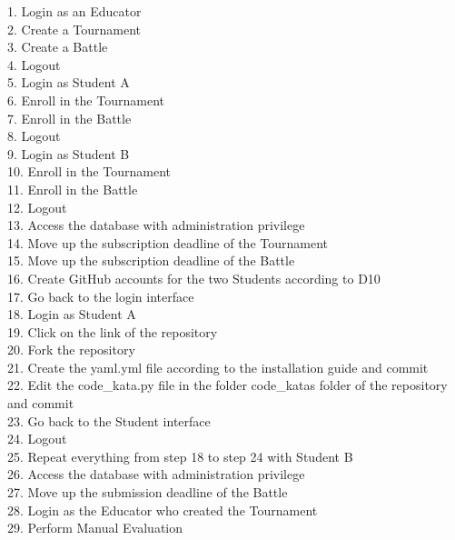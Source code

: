 \documentclass{Configuration_Files/Template}
\begin{document}
\begin{itemize}
\begin{enumerate}
            1. Login as an Educator\\
            2. Create a Tournament\\
            3. Create a Battle\\
            4. Logout\\
            5. Login as Student A\\
            6. Enroll in the Tournament\\
            7. Enroll in the Battle\\
            8. Logout\\
            9. Login as Student B\\
            10. Enroll in the Tournament\\
            11. Enroll in the Battle\\
            12. Logout\\
            13. Access the database with administration privilege\\
            14. Move up the subscription deadline of the Tournament\\
            15. Move up the subscription deadline of the Battle\\
            16. Create GitHub accounts for the two Students according to D10\\
            17. Go back to the login interface\\
            18. Login as Student A\\
            19. Click on the link of the repository\\
            20. Fork the repository\\
            21. Create the yaml.yml file according to the installation guide and commit\\
            22. Edit the code\_kata.py file in the folder code\_katas folder of the repository and commit\\
            23. Go back to the Student interface\\
            24. Logout\\
            25. Repeat everything from step 18 to step 24 with Student B\\
            26. Access the database with administration privilege\\
            27. Move up the submission deadline of the Battle\\
            28. Login as the Educator who created the Tournament\\
            29. Perform Manual Evaluation
        

\end{enumerate}
\end{itemize}
\end{document}
